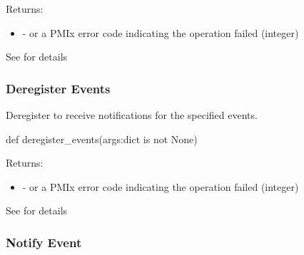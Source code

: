 \begin{arglist}
\end{arglist}

Returns:
\begin{itemize}
    \item {} -  or a \ac{PMIx} error code indicating the operation failed (integer)
\end{itemize}

See  for details


\subsubsection{Deregister Events}

\summary

Deregister to receive notifications for the specified events.

\format

\pyspecificstart
\begin{codepar}
def deregister_events(args:dict is not None)
\end{codepar}
\pyspecificend

\begin{arglist}
\end{arglist}

Returns:
\begin{itemize}
    \item {} -  or a \ac{PMIx} error code indicating the operation failed (integer)
\end{itemize}

See  for details


\subsubsection{Notify Event}


